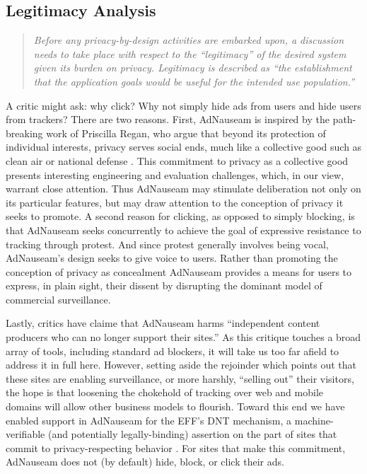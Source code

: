 \documentclass[conference]{IEEEtran}
\begin{document}
\subsection{Legitimacy Analysis}

\blockquote{\emph{Before any privacy-by-design activities are embarked upon, a discussion needs to take place with respect to the “legitimacy” of the desired system given its burden on privacy. Legitimacy is described as “the establishment that the application goals would be useful for the intended use population.”}\cite{Iachello}\cite{Gurses-1}}

\noindent A critic might ask: why click? Why not simply hide ads from users and hide users from trackers? There are two reasons. First, AdNauseam is inspired by the path-breaking work of Priscilla Regan, who argue that beyond its protection of individual interests, privacy serves social ends, much like a collective good such as clean air or national defense \cite{Regan}. This commitment to privacy as a collective good presents interesting engineering and evaluation challenges, which, in our view, warrant close attention. Thus AdNauseam may stimulate deliberation not only on its particular features, but may draw attention to the conception of privacy it seeks to promote. A second reason for clicking, as opposed to simply blocking, is that AdNauseam seeks concurrently to achieve the goal of expressive resistance to tracking through protest. And since protest generally involves being vocal, AdNauseam's design seeks to give voice to users. Rather than promoting the conception of privacy as concealment AdNauseam provides a means for users to express, in plain sight, their dissent by disrupting the dominant model of commercial surveillance.

Lastly, critics have claime that AdNauseam harms “independent content producers who can no longer support their sites.” As this critique touches a broad array of tools, including standard ad blockers, it will take us too far afield to address it in full here. However, setting aside the rejoinder which points out that these sites are enabling surveillance, or more harshly, “selling out” their visitors, the hope is that loosening the chokehold of tracking over web and mobile domains will allow other business models to flourish. Toward this end we have enabled support in AdNauseam for the EFF's DNT mechanism, a machine-verifiable (and potentially legally-binding) assertion on the part of sites that commit to privacy-respecting behavior \cite{EFF-1}. For sites that make this commitment, AdNauseam does not (by default) hide, block, or click their ads.
\end{document}
